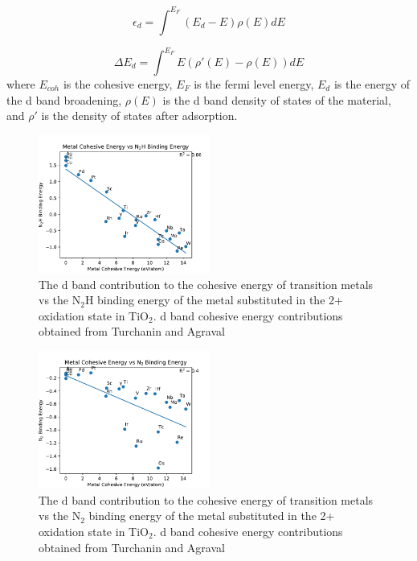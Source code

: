 \documentclass[catalysts,article,submit,moreauthors,pdftex,10pt,a4paper]{mdpi}
\theoremstyle{mdpi}
\newcounter{ex}
\newcounter{re}
\theoremstyle{mdpidefinition}
\begin{document}
\begin{equation}
    \epsilon_d = \int^{E_F} (E_d-E)\rho(E)dE
    \label{eq:d_band_cohesive}
\end{equation}

\begin{equation}
    \Delta E_d = \int^{E_F} E(\rho'(E) - \rho(E)) dE
    \label{eq:d_band}
\end{equation}
where $E_{coh}$ is the cohesive energy, $E_F$ is the fermi level energy, $E_d$ is the energy of the d band broadening, $\rho(E)$ is the d band density of states of the material, and $\rho'$ is the density of states after adsorption. 


\begin{figure}
    \centering
    \includegraphics[width=0.5\textwidth]{Images/cohesive_eng_vs_N2H.pdf}
    
    \caption{The d band contribution to the cohesive energy of transition metals vs the N$_2$H binding energy of the metal substituted in the 2+ oxidation state in TiO$_2$. d band cohesive energy contributions obtained from Turchanin and Agraval\cite{Turchanin_2008}}
    \label{fig:N2H_cohesive}
\end{figure}

\begin{figure}
    \centering
    \includegraphics[width=0.5\textwidth]{Images/cohesive_eng_vs_N2.pdf}
    
    \caption{The d band contribution to the cohesive energy of transition metals vs the N$_2$ binding energy of the metal substituted in the 2+ oxidation state in TiO$_2$. d band cohesive energy contributions obtained from Turchanin and Agraval\cite{Turchanin_2008}}
    \label{fig:N2_cohesive}
\end{figure}
\end{document}
